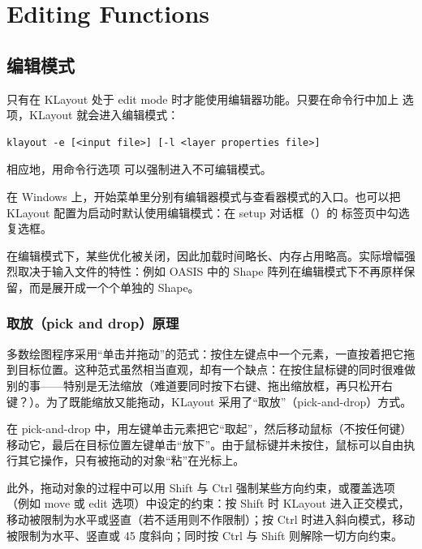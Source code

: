 \chapter{Editing Functions}\label{ch:editor}

\section{编辑模式}\label{sec:edit_mode}

只有在 KLayout 处于 edit mode 时才能使用编辑器功能。只要在命令行中加上  选项，KLayout 就会进入编辑模式：

\begin{lstlisting}
klayout -e [<input file>] [-l <layer properties file>]
\end{lstlisting}

相应地，用命令行选项  可以强制进入不可编辑模式。

在 Windows 上，开始菜单里分别有编辑器模式与查看器模式的入口。也可以把 KLayout 配置为启动时默认使用编辑模式：在 setup 对话框（）的  标签页中勾选  复选框。

在编辑模式下，某些优化被关闭，因此加载时间略长、内存占用略高。实际增幅强烈取决于输入文件的特性：例如 OASIS 中的 Shape 阵列在编辑模式下不再原样保留，而是展开成一个个单独的 Shape。

\subsection{取放（pick and drop）原理}\label{sec:pick_and_drop}

多数绘图程序采用“单击并拖动”的范式：按住左键点中一个元素，一直按着把它拖到目标位置。这种范式虽然相当直观，却有一个缺点：在按住鼠标键的同时很难做别的事——特别是无法缩放（难道要同时按下右键、拖出缩放框，再只松开右键？）。为了既能缩放又能拖动，KLayout 采用了“取放”（pick-and-drop）方式。

在 pick-and-drop 中，用左键单击元素把它“取起”，然后移动鼠标（不按任何键）移动它，最后在目标位置左键单击“放下”。由于鼠标键并未按住，鼠标可以自由执行其它操作，只有被拖动的对象“粘”在光标上。

此外，拖动对象的过程中可以用 Shift 与 Ctrl 强制某些方向约束，或覆盖选项（例如 move 或 edit 选项）中设定的约束：按 Shift 时 KLayout 进入正交模式，移动被限制为水平或竖直（若不适用则不作限制）；按 Ctrl 时进入斜向模式，移动被限制为水平、竖直或 45 度斜向；同时按 Ctrl 与 Shift 则解除一切方向约束。

